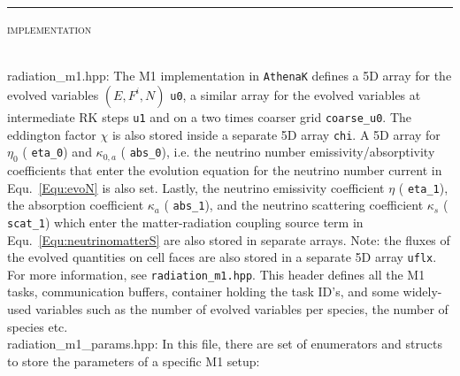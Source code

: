 \documentclass{article}
\newcommand{\var}[1]{%
  {\setlength{\fboxsep}{1.5pt}%
   \colorbox{varbg}{\textcolor{varfg}{\texttt{\small #1}}}}}
\newcommand{\step}[1]{%
  \par\medskip\noindent
  {\color{stepfg}\rule[-0.15ex]{2pt}{1.5ex}\hspace{0.5em}\scshape #1}%
  \hspace{0.75em}\ignorespaces}
\begin{document}
\step{implementation}\mbox{}\\
{\color{gray}radiation\_m1.hpp:} The M1 implementation in \texttt{AthenaK} defines a 5D array for the evolved variables $(E,F^i,N)$ \var{u0}, a similar array for the
evolved variables at intermediate RK steps \var{u1} and on a two times coarser grid \var{coarse\_u0}. The eddington factor $\chi$ is also stored inside
a separate 5D array \var{chi}. A 5D array for $\eta_0$ (\var{eta\_0}) and $\kappa_{0,a}$ (\var{abs\_0}), i.e. the neutrino number emissivity/absorptivity coefficients that
enter the evolution equation for the neutrino number current in Equ.~\eqref{Equ:evoN} is also set. Lastly, the neutrino emissivity coefficient $\eta$ (\var{eta\_1}), the
absorption coefficient $\kappa_a$ (\var{abs\_1}), and the neutrino scattering coefficient $\kappa_s$ (\var{scat\_1}) which enter the matter-radiation coupling source term
in Equ.~\eqref{Equ:neutrinomatterS} are also stored in separate arrays. Note: the fluxes of the evolved quantities on cell faces are also
stored in a separate 5D array \var{uflx}. For more information, see \var{radiation\_m1.hpp}. This header defines all the M1 tasks, communication buffers, container holding
the task ID's, and some widely-used variables such as the number of evolved variables per species, the number of species etc.\\
{\color{gray}radiation\_m1\_params.hpp:} In this file, there are set of enumerators and structs to store the parameters of a specific M1 setup:
\end{document}
